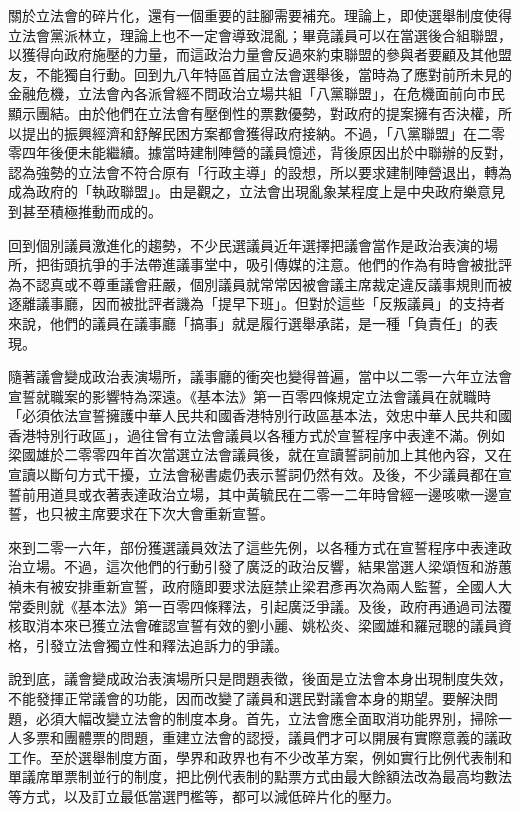 關於立法會的碎片化，還有一個重要的註腳需要補充。理論上，即使選舉制度使得立法會黨派林立，理論上也不一定會導致混亂；畢竟議員可以在當選後合組聯盟，以獲得向政府施壓的力量，而這政治力量會反過來約束聯盟的參與者要顧及其他盟友，不能獨自行動。回到九八年特區首屆立法會選舉後，當時為了應對前所未見的金融危機，立法會內各派曾經不問政治立場共組「八黨聯盟」，在危機面前向市民顯示團結。由於他們在立法會有壓倒性的票數優勢，對政府的提案擁有否決權，所以提出的振興經濟和舒解民困方案都會獲得政府接納。不過，「八黨聯盟」在二零零四年後便未能繼續。據當時建制陣營的議員憶述，背後原因出於中聯辦的反對，認為強勢的立法會不符合原有「行政主導」的設想，所以要求建制陣營退出，轉為成為政府的「執政聯盟」。由是觀之，立法會出現亂象某程度上是中央政府樂意見到甚至積極推動而成的。

回到個別議員激進化的趨勢，不少民選議員近年選擇把議會當作是政治表演的場所，把街頭抗爭的手法帶進議事堂中，吸引傳媒的注意。他們的作為有時會被批評為不認真或不尊重議會莊嚴，個別議員就常常因被會議主席裁定違反議事規則而被逐離議事廳，因而被批評者譏為「提早下班」。但對於這些「反叛議員」的支持者來說，他們的議員在議事廳「搞事」就是履行選舉承諾，是一種「負責任」的表現。

隨著議會變成政治表演場所，議事廳的衝突也變得普遍，當中以二零一六年立法會宣誓就職案的影響特為深遠。《基本法》第一百零四條規定立法會議員在就職時「必須依法宣誓擁護中華人民共和國香港特別行政區基本法，效忠中華人民共和國香港特別行政區」，過往曾有立法會議員以各種方式於宣誓程序中表達不滿。例如梁國雄於二零零四年首次當選立法會議員後，就在宣讀誓詞前加上其他內容，又在宣讀以斷句方式干擾，立法會秘書處仍表示誓詞仍然有效。及後，不少議員都在宣誓前用道具或衣著表達政治立場，其中黃毓民在二零一二年時曾經一邊咳嗽一邊宣誓，也只被主席要求在下次大會重新宣誓。

來到二零一六年，部份獲選議員效法了這些先例，以各種方式在宣誓程序中表達政治立場。不過，這次他們的行動引發了廣泛的政治反響，結果當選人梁頌恆和游蕙禎未有被安排重新宣誓，政府隨即要求法庭禁止梁君彥再次為兩人監誓，全國人大常委則就《基本法》第一百零四條釋法，引起廣泛爭議。及後，政府再通過司法覆核取消本來已獲立法會確認宣誓有效的劉小麗、姚松炎、梁國雄和羅冠聰的議員資格，引發立法會獨立性和釋法追訴力的爭議。

說到底，議會變成政治表演場所只是問題表徵，後面是立法會本身出現制度失效，不能發揮正常議會的功能，因而改變了議員和選民對議會本身的期望。要解決問題，必須大幅改變立法會的制度本身。首先，立法會應全面取消功能界別，掃除一人多票和團體票的問題，重建立法會的認授，議員們才可以開展有實際意義的議政工作。至於選舉制度方面，學界和政界也有不少改革方案，例如實行比例代表制和單議席單票制並行的制度，把比例代表制的點票方式由最大餘額法改為最高均數法等方式，以及訂立最低當選門檻等，都可以減低碎片化的壓力。

